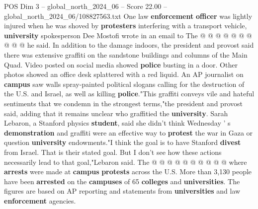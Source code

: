 \begin{textsample}{POS Dim 3 – global\_north\_2024\_06 – Score 22.00 – global\_north\_2024\_06/108827563.txt}
One law \textbf{enforcement} \textbf{officer} was lightly injured when he was shoved by \textbf{protesters} interfering with a transport vehicle, \textbf{university} spokesperson Dee Mostofi wrote in an email to The @ @ @ @ @ @ @ @ @ @ he said.
In addition to the damage indoors, the president and provost said there was extensive graffiti on the sandstone buildings and columns of the Main Quad.
Video posted on social media showed \textbf{police} busting in a door.
Other photos showed an office desk splattered with a red liquid.
An AP journalist on \textbf{campus} saw walls spray-painted political slogans calling for the destruction of the U.S. and Israel, as well as killing \textbf{police}."This graffiti conveys vile and hateful sentiments that we condemn in the strongest terms,"the president and provost said, adding that it remains unclear who graffitied the \textbf{university}.
Sarah Lebaron, a Stanford physics \textbf{student}, said she didn't think Wednesday ' s \textbf{demonstration} and graffiti were an effective way to \textbf{protest} the war in Gaza or question \textbf{university} endowments."I think the goal is to have Stanford \textbf{divest} from Israel.
That is their stated goal.
But I don't see how these actions necessarily lead to that goal,"Lebaron said.
The @ @ @ @ @ @ @ @ @ @ where \textbf{arrests} were made at \textbf{campus} \textbf{protests} across the U.S.
More than 3,130 people have been \textbf{arrested} on the \textbf{campuses} of 65 \textbf{colleges} and \textbf{universities}.
The figures are based on AP reporting and statements from \textbf{universities} and law \textbf{enforcement} agencies.

\end{textsample}
